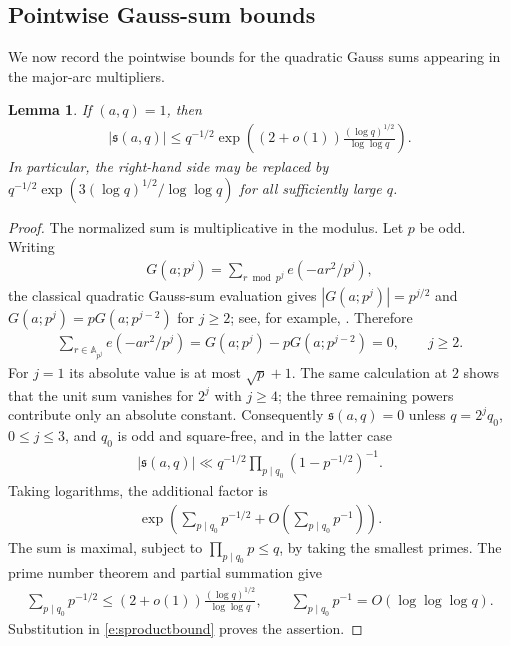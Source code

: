 \documentclass[12pt,reqno]{amsart}
\numberwithin{equation}{section}
\newtheorem{lemma}[equation]{Lemma}
\theoremstyle{definition}
\theoremstyle{remark}
\begin{document}
\subsection{Pointwise Gauss-sum bounds}

We now record the pointwise bounds for the quadratic Gauss sums appearing in the major-arc multipliers.
\begin{lemma}\label{l:inftyboundsaq}
If $(a,q)=1$, then
\begin{align}\label{e:gaussboundknown}
 |\mathfrak s(a,q)|
 \leq q^{-1/2}
 \exp\left((2+o(1))\frac{(\log q)^{1/2}}{\log\log q}\right).
\end{align}
In particular, the right-hand side may be replaced by
$q^{-1/2}\exp(3(\log q)^{1/2}/\log\log q)$ for all sufficiently large
$q$.
\end{lemma}

\begin{proof}
The normalized sum is multiplicative in the modulus.  Let $p$ be odd.
Writing
\begin{align*}
 G(a;p^j)=\sum_{r\bmod p^j}e(-ar^2/p^j),
\end{align*}
the classical quadratic Gauss-sum evaluation gives
$|G(a;p^j)|=p^{j/2}$ and $G(a;p^j)=pG(a;p^{j-2})$ for $j\geq2$;
see, for example, \cite[Chapter~3]{iwaniec}.  Therefore
\begin{align}\label{e:primepowerestimate}
 \sum_{r\in\mathbb A_{p^j}}e(-ar^2/p^j)
 =G(a;p^j)-pG(a;p^{j-2})=0,\qquad j\geq2.
\end{align}
For $j=1$ its absolute value is at most $\sqrt p+1$.  The same
calculation at $2$ shows that the unit sum vanishes for $2^j$ with
$j\geq4$; the three remaining powers contribute only an absolute
constant.  Consequently $\mathfrak s(a,q)=0$ unless
$q=2^jq_0$, $0\leq j\leq3$, and $q_0$ is odd and square-free, and in
the latter case
\begin{align}\label{e:sproductbound}
 |\mathfrak s(a,q)|
 \ll q^{-1/2}\prod_{p\mid q_0}(1-p^{-1/2})^{-1}.
\end{align}
Taking logarithms, the additional factor is
\begin{align*}
 \exp\left(\sum_{p\mid q_0}p^{-1/2}+O\left(\sum_{p\mid q_0}p^{-1}\right)\right).
\end{align*}
The sum is maximal, subject to $\prod_{p\mid q_0}p\leq q$, by taking
the smallest primes.  The prime number theorem and partial summation
give
\begin{align*}
 \sum_{p\mid q_0}p^{-1/2}
 \leq(2+o(1))\frac{(\log q)^{1/2}}{\log\log q},\qquad
 \sum_{p\mid q_0}p^{-1}=O(\log\log\log q).
\end{align*}
Substitution in \eqref{e:sproductbound} proves the assertion.
\end{proof}
\end{document}
